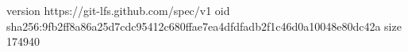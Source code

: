 version https://git-lfs.github.com/spec/v1
oid sha256:9fb2ff8a86a25d7cdc95412c680ffae7ea4dfdfadb2f1c46d0a10048e80dc42a
size 174940
